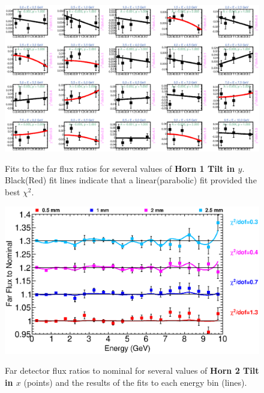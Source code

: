 {\begin{figure}[ht]
  \begin{center}
    {\includegraphics[width=5.0in]{figures/Horn1YTilt_far_fits.eps}}
  \end{center}
\caption{ Fits to the far flux ratios for several values of {\bf Horn 1 Tilt in $y$}. Black(Red) fit lines indicate that a linear(parabolic) fit provided the best $\chi^2$. }
\end{figure}

\clearpage

\begin{figure}[ht]
  \begin{center}
    {\includegraphics[width=6.0in]{figures/Horn2XTilt_far_summary.eps}}
  \end{center}
\caption{ Far detector flux ratios to nominal for several values of {\bf Horn 2 Tilt in $x$} (points) and the results of the fits to each energy bin (lines).}
\end{figure}

}
